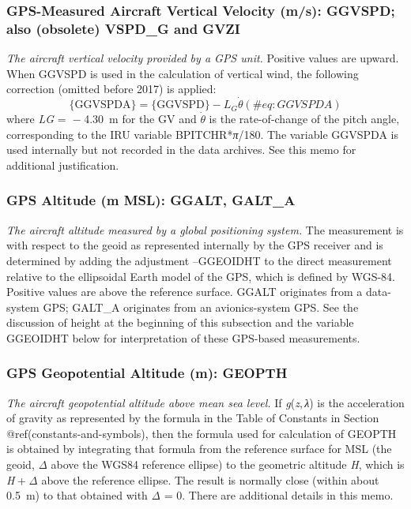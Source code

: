 \documentclass[
  english,
]{book}
\begin{document}
\hypertarget{ggvspd}{%
\subsubsection*{GPS-Measured Aircraft Vertical Velocity (m/s): GGVSPD;
also (obsolete) VSPD\_G and GVZI}\label{ggvspd}}

\emph{The aircraft vertical velocity provided by a GPS unit.} Positive
values are upward. When GGVSPD is used in the calculation of vertical
wind, the following correction (omitted before 2017) is applied:
\begin{equation}
\mathrm{\{GGVSPDA\}} = \mathrm{\{GGVSPD\}}-L_{G}\dot{\theta}
(\#eq:GGVSPDA)
\end{equation} where {\emph{L}\emph{G} =  − 4.30}~m for the GV and
\(\dot{\theta}\) is the rate-of-change of the pitch angle, corresponding
to the IRU variable BPITCHR*{\emph{π}}/180. The variable GGVSPDA is used
internally but not recorded in the data archives. See this memo for
additional justification.

\hypertarget{ggalt}{%
\subsubsection*{GPS Altitude (m MSL): GGALT, GALT\_A}\label{ggalt}}

\emph{The aircraft altitude} \emph{measured by a global positioning
system.} The measurement is with respect to the geoid as represented
internally by the GPS receiver and is determined by adding the
adjustment --GGEOIDHT to the direct measurement relative to the
ellipsoidal Earth model of the GPS, which is defined by WGS-84. Positive
values are above the reference surface. GGALT originates from a
data-system GPS; GALT\_A originates from an avionics-system GPS. See the
discussion of height at the beginning of this subsection and the
variable GGEOIDHT below for interpretation of these GPS-based
measurements.

\hypertarget{geoph}{%
\subsubsection*{GPS Geopotential Altitude (m): GEOPTH}\label{geoph}}

\emph{The aircraft geopotential altitude above mean sea level.} If
{\emph{g}(\emph{z}, \emph{λ})} is the acceleration of gravity as
represented by the formula in the Table of Constants in Section
@ref(constants-and-symbols), then the formula used for calculation of
GEOPTH is obtained by integrating that formula from the reference
surface for MSL (the geoid, {\emph{Δ}} above the WGS84 reference
ellipse) to the geometric altitude {\emph{H}}, which is
{\emph{H} + \emph{Δ}} above the reference ellipse. The result is
normally close (within about 0.5~m) to that obtained with
{\emph{Δ} = 0}. There are additional details in this memo.
\end{document}
